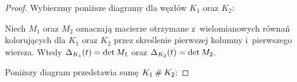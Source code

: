 \begin{proof}
    Wybierzmy poniższe diagramy dla węzłów $K_1$ oraz $K_2$:

    Niech $M_1$ oraz $M_2$ oznaczają macierze otrzymane z~wielomianowych równań kolorujących dla $K_1$ oraz $K_2$ przez skreślenie pierwszej kolumny i~pierwszego wiersza.
    Wtedy $\Delta_{K_1}(t) = \det M_1$ oraz $\Delta_{K_2}(t) = \det M_2$.
    
    Poniższy diagram przedstawia sumę $K_1 \mathbin{\#} K_2$:

\end{proof}
